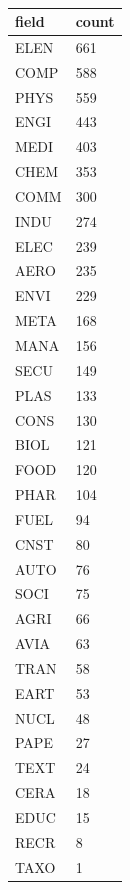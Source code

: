\documentclass[12pt,letterpaper]{article}
\begin{document}
\begin{table}[H]
\scriptsize
\centering
\begin{tabular}{ll}
\hline
field & count \\ \hline
ELEN  & 661   \\
COMP  & 588   \\
PHYS  & 559   \\
ENGI  & 443   \\
MEDI  & 403   \\
CHEM  & 353   \\
COMM  & 300   \\
INDU  & 274   \\
ELEC  & 239   \\
AERO  & 235   \\
ENVI  & 229   \\
META  & 168   \\
MANA  & 156   \\
SECU  & 149   \\
PLAS  & 133   \\
CONS  & 130   \\
BIOL  & 121   \\
FOOD  & 120   \\
PHAR  & 104   \\
FUEL  & 94    \\
CNST  & 80    \\
AUTO  & 76    \\
SOCI  & 75    \\
AGRI  & 66    \\
AVIA  & 63    \\
TRAN  & 58    \\
EART  & 53    \\
NUCL  & 48    \\
PAPE  & 27    \\
TEXT  & 24    \\
CERA  & 18    \\
EDUC  & 15    \\
RECR  & 8     \\
TAXO  & 1     \\ \hline
\end{tabular}
\caption{}
\label{tab:my-table}
\end{table}
\end{document}
